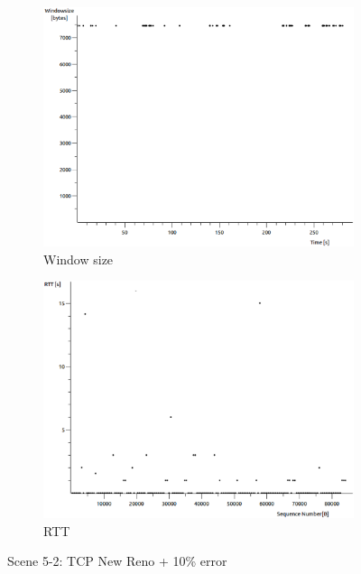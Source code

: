 \documentclass[conference,a4paper]{IEEEtran}
\begin{document}
\begin{figure}
\begin{subfigure}[b]{0.2\textwidth}
  \includegraphics[width=\textwidth]{s5-2_wsize}
  \caption{Window size}
 \end{subfigure}
 \begin{subfigure}[b]{0.2\textwidth}
  \includegraphics[width=\textwidth]{s5-2_rtt}
  \caption{RTT}
 \end{subfigure}
 \caption{Scene 5-2: TCP New Reno + 10\% error}
\end{figure}
\end{document}

